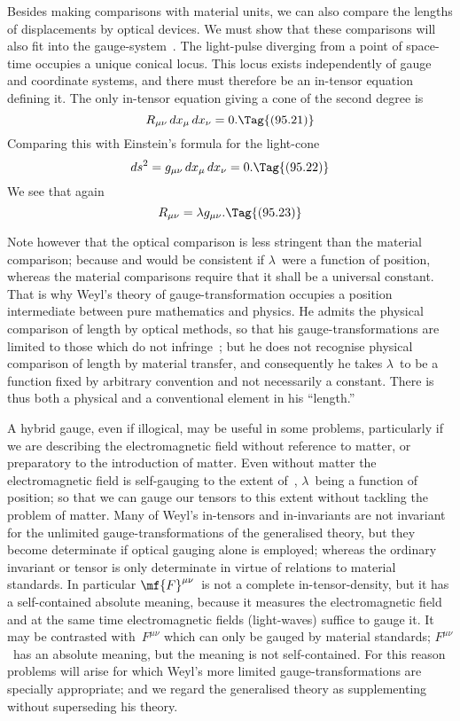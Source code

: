 \documentclass[12pt]{book}
\begin{document}
Besides making comparisons with material units, we can also compare the
lengths of displacements by optical devices. We must show that these comparisons
will also fit into the gauge-system~. The light-pulse diverging
%
from a point of space-time occupies a unique conical locus. This locus exists
independently of gauge and coordinate systems, and there must therefore be
an in-tensor equation defining it. The only in-tensor equation giving a cone
of the second degree is
\[
R_{\mu\nu}\, dx_{\mu}\, dx_{\nu} = 0.
\Tag{(95.21)}
\]
Comparing this with Einstein's formula for the light-cone
\[
ds^{2} = g_{\mu\nu}\, dx_{\mu}\, dx_{\nu} = 0.
\Tag{(95.22)}
\]
We see that again
\[
R_{\mu\nu} = \lambda g_{\mu\nu}.
\Tag{(95.23)}
\]

Note however that the optical comparison is less stringent than the
material comparison; because  and  would be consistent if $\lambda$~were
a function of position, whereas the material comparisons require that it
shall be a universal constant. That is why Weyl's theory of gauge-transformation
occupies a position intermediate between pure mathematics and physics.
He admits the physical comparison of length by optical methods, so that his
gauge-transformations are limited to those which do not infringe~; but
he does not recognise physical comparison of length by material transfer, and
consequently he takes $\lambda$~to be a function fixed by arbitrary convention and
not necessarily a constant. There is thus both a physical and a conventional
element in his ``length.''

A hybrid gauge, even if illogical, may be useful in some problems, particularly
if we are describing the electromagnetic field without reference to
matter, or preparatory to the introduction of matter. Even without matter
the electromagnetic field is self-gauging to the extent of~, $\lambda$~being a
function of position; so that we can gauge our tensors to this extent without
tackling the problem of matter. Many of Weyl's in-tensors and in-invariants
are not invariant for the unlimited gauge-transformations of the generalised
theory, but they become determinate if optical gauging alone is employed;
whereas the ordinary invariant or tensor is only determinate in virtue of
relations to material standards. In particular $\mf{F}^{\mu\nu}$~is not a complete in-tensor-density,
but it has a self-contained absolute meaning, because it measures the
electromagnetic field and at the same time electromagnetic fields (light-waves)
suffice to gauge it. It may be contrasted with~$F^{\mu\nu}$ which can only be gauged
by material standards; $F^{\mu\nu}$~has an absolute meaning, but the meaning is not
self-contained. For this reason problems will arise for which Weyl's more
limited gauge-transformations are specially appropriate; and we regard the
generalised theory as supplementing without superseding his theory.
\end{document}
